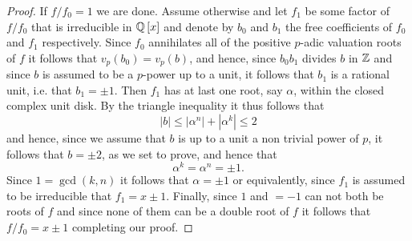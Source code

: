 \documentclass[../main.tex]{subfiles}
\begin{document}
\begin{proof}
  If $f / f_0 = 1$ we are done.
  Assume otherwise and let $f_1$ be some factor of $f / f_0$ that is irreducible in $\mathbb{Q}\left[ x \right]$ and denote by $b_0$ and $b_1$ the free coefficients of $f_0$ and $f_1$ respectively.
  Since $f_0$ annihilates all of the positive $p$-adic valuation roots of $f$ it follows that $v_p\left( b_0 \right) = v_p\left( b \right)$, and hence, since $b_0 b_1$ divides $b$ in $\mathbb{Z}$ and since $b$ is assumed to be a $p$-power up to a unit, it follows that $b_1$ is a rational unit, i.e. that $b_1 = \pm 1$.
  Then $f_1$ has at last one root, say $\alpha$, within the closed complex unit disk.
  By the triangle inequality it thus follows that
  \[
    \left| b \right| \leq \left| \alpha^n \right| + \left| \alpha^k \right| \leq 2
  \]
  and hence, since we assume that $b$ is up to a unit a non trivial power of $p$, it follows that $b = \pm 2$, as we set to prove, and hence that 
  \[
    \alpha^k = \alpha^n = \pm 1.
  \]
  Since $1 = \gcd\left( k,n \right)$ it follows that $\alpha = \pm 1$ or equivalently, since $f_1$ is assumed to be irreducible that $f_1 = x \pm 1$.
  Finally, since $1$ and $=-1$ can not both be roots of $f$ and since none of them can be a double root of $f$ it follows that $f / f_0 = x \pm 1$ completing our proof.
\end{proof}
\end{document}
